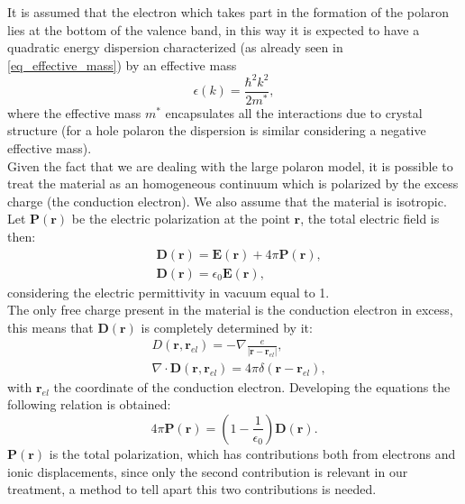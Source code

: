 It is assumed that the electron which takes part in the formation of the polaron lies at the bottom of the valence band, in this way it is 
expected to have a quadratic energy dispersion characterized (as already seen in \ref{eq_effective_mass}) by an effective mass
\begin{equation}
    \epsilon(k)=\frac{\hbar^2k^2}{2m^*},
\end{equation}
where the effective mass $m^*$ encapsulates all the interactions due to crystal structure (for a hole polaron the dispersion is similar 
considering a negative effective mass).\\
Given the fact that we are dealing with the large polaron model, it is possible to treat the material as an homogeneous continuum 
which is polarized by the excess charge (the conduction electron). We also assume that the material is isotropic.
Let $\mathbf{P}(\mathbf{r})$ be the electric polarization at the point $\mathbf{r}$, the total electric field is then:
\begin{equation}
\begin{split}
    &\mathbf{D}(\mathbf{r})=\mathbf{E}(\mathbf{r})+4\pi \mathbf{P}(\mathbf{r}),\\
    &\mathbf{D}(\mathbf{r})=\epsilon_0 \mathbf{E}(\mathbf{r}),
\end{split}
\end{equation} 
considering the electric permittivity in vacuum equal to 1.\\
The only free charge present in the material is the conduction electron in excess, this means that $\mathbf{D}(\mathbf{r})$ is completely determined by it:
\begin{equation}
\begin{split}
    &D(\mathbf{r},\mathbf{r}_{el})=-\nabla\frac{e}{|\mathbf{r}-\mathbf{r}_{el}|}, \\
    &\nabla\cdot \mathbf{D}(\mathbf{r},\mathbf{r}_{el})=4\pi\delta(\mathbf{r}-\mathbf{r}_{el}),
\end{split}
\end{equation}
with $\mathbf{r}_{el}$ the coordinate of the conduction electron. Developing the equations the following relation is obtained:
\begin{equation}
    4\pi \mathbf{P}(\mathbf{r}) = \left(1-\frac{1}{\epsilon_0}\right)\mathbf{D}(\mathbf{r}).
\end{equation}
$\mathbf{P}(\mathbf{r})$ is the total polarization, which has contributions both from electrons and ionic displacements, since only the second 
contribution is relevant in our treatment, a method to tell apart this two contributions is needed.\\
